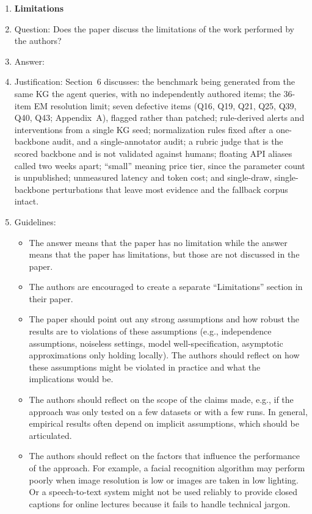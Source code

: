 \begin{enumerate}
\item {\bf Limitations}
    \item[] Question: Does the paper discuss the limitations of the work performed by the authors?
    \item[] Answer: \answerYes{}
    \item[] Justification: Section~6 discusses: the benchmark being generated from the same KG the agent queries, with no independently authored items; the 36-item EM resolution limit; seven defective items (Q16, Q19, Q21, Q25, Q39, Q40, Q43; Appendix~A), flagged rather than patched; rule-derived alerts and interventions from a single KG seed; normalization rules fixed after a one-backbone audit, and a single-annotator audit; a rubric judge that is the scored backbone and is not validated against humans; floating API aliases called two weeks apart; ``small'' meaning price tier, since the parameter count is unpublished; unmeasured latency and token cost; and single-draw, single-backbone perturbations that leave most evidence and the fallback corpus intact.
    \item[] Guidelines:
    \begin{itemize}
        \item The answer \answerNA{} means that the paper has no limitation while the answer \answerNo{} means that the paper has limitations, but those are not discussed in the paper. 
        \item The authors are encouraged to create a separate ``Limitations'' section in their paper.
        \item The paper should point out any strong assumptions and how robust the results are to violations of these assumptions (e.g., independence assumptions, noiseless settings, model well-specification, asymptotic approximations only holding locally). The authors should reflect on how these assumptions might be violated in practice and what the implications would be.
        \item The authors should reflect on the scope of the claims made, e.g., if the approach was only tested on a few datasets or with a few runs. In general, empirical results often depend on implicit assumptions, which should be articulated.
        \item The authors should reflect on the factors that influence the performance of the approach. For example, a facial recognition algorithm may perform poorly when image resolution is low or images are taken in low lighting. Or a speech-to-text system might not be used reliably to provide closed captions for online lectures because it fails to handle technical jargon.

\end{itemize}
\end{enumerate}
